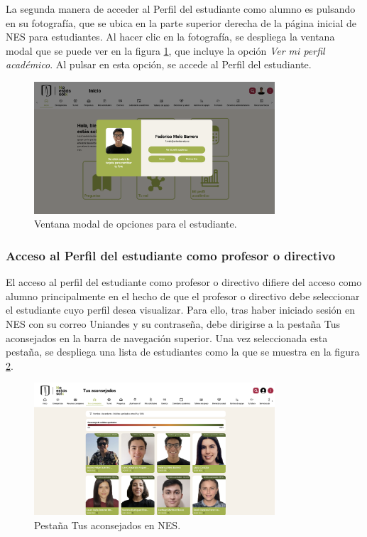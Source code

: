 La segunda manera de acceder al Perfil del estudiante como alumno es pulsando en su fotografía, que se ubica en la parte superior derecha de la página inicial de \gls{NES} para estudiantes. Al hacer clic en la fotografía, se despliega la ventana modal que se puede ver en la figura \ref{fig:menu_estudiante}, que incluye la opción \textit{Ver mi perfil académico}. Al pulsar en esta opción, se accede al Perfil del estudiante.

\begin{figure}[H]
	\centering
	\includegraphics[width=0.8\textwidth]{assets/nes/menu_estudiante.png}
	\caption{Ventana modal de opciones para el estudiante.}
	\label{fig:menu_estudiante}
\end{figure}

\subsubsection{Acceso al Perfil del estudiante como profesor o directivo}

El acceso al perfil del estudiante como profesor o directivo difiere del acceso como alumno principalmente en el hecho de que el profesor o directivo debe seleccionar el estudiante cuyo perfil desea visualizar. Para ello, tras haber iniciado sesión en \gls{NES} con su correo Uniandes y su contraseña, debe dirigirse a la pestaña Tus aconsejados en la barra de navegación superior. Una vez seleccionada esta pestaña, se despliega una lista de estudiantes como la que se muestra en la figura \ref{fig:tus_aconsejados}.

\begin{figure}[H]
	\centering
	\includegraphics[width=0.8\textwidth]{assets/nes/tus_aconsejados.png}
	\caption{Pestaña Tus aconsejados en NES.}
	\label{fig:tus_aconsejados}
\end{figure}

